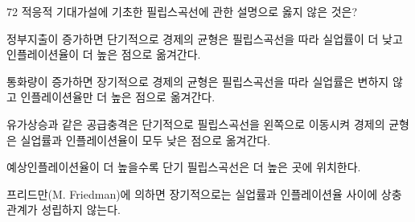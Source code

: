 \begin{question}{72}
적응적 기대가설에 기초한 필립스곡선에 관한 설명으로 옳지 않은 것은?
\begin{choices}
  \item 정부지출이 증가하면 단기적으로 경제의 균형은 필립스곡선을 따라 실업률이 더 낮고 인플레이션율이 더 높은 점으로 옮겨간다.
  \item 통화량이 증가하면 장기적으로 경제의 균형은 필립스곡선을 따라 실업률은 변하지 않고 인플레이션율만 더 높은 점으로 옮겨간다.
  \item 유가상승과 같은 공급충격은 단기적으로 필립스곡선을 왼쪽으로 이동시켜 경제의 균형은 실업률과 인플레이션율이 모두 낮은 점으로 옮겨간다.
  \item 예상인플레이션율이 더 높을수록 단기 필립스곡선은 더 높은 곳에 위치한다.
  \item 프리드만(M. Friedman)에 의하면 장기적으로는 실업률과 인플레이션율 사이에 상충관계가 성립하지 않는다.
\end{choices}
\end{question}
